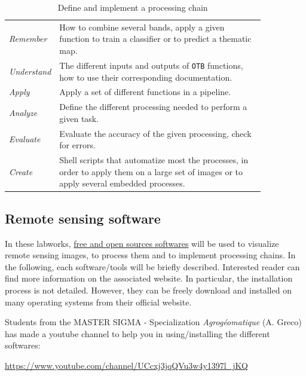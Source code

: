 \documentclass[a4paper,11pt,DIV=18]{scrartcl}
\begin{document}
\begin{table}[htbp]
\caption{\label{tab:org18adc9a}
Define and implement a processing chain}
\centering
\begin{tabular}{lp{0.85\linewidth}}
\toprule
\emph{Remember} & How to  combine several bands, apply a given  function to train  a classifier or to predict a thematic map.\\
\emph{Understand} & The different  inputs and outputs of  \texttt{OTB} functions, how  to use their corresponding documentation.\\
\emph{Apply} & Apply a set of different functions in a pipeline.\\
\emph{Analyze} & Define the different processing needed to perform a given task.\\
\emph{Evaluate} & Evaluate the accuracy of the given processing, check for errors.\\
\emph{Create} & Shell scripts that automatize most the processes, in order to  apply them  on a large set of images  or to apply  several embedded  processes.\\
\bottomrule
\end{tabular}
\end{table}

\subsection{Remote sensing software}
\label{sec:org84cc0a9}
In these  labworks, \href{https://www.fsf.org/}{free and  open sources  softwares} will be  used to
visualize  remote sensing  images, to  process them  and to  implement
processing  chains.  In  the  following, each  software/tools will  be
briefly described.  Interested reader can find more information on the
associated website.   In particular,  the installation process  is not
detailed. However, they  can be freely download and  installed on many
operating systems from their official website.

Students  from  the  MASTER   SIGMA  -  Specialization  \emph{Agrogéomatique}
(A. Greco) has made a youtube  channel to help you in using/installing
the                        different                        softwares:
\begin{center}
\url{https://www.youtube.com/channel/UCcxj3jqQVu3w4y1397l\_jKQ}
\end{center}
\end{document}
